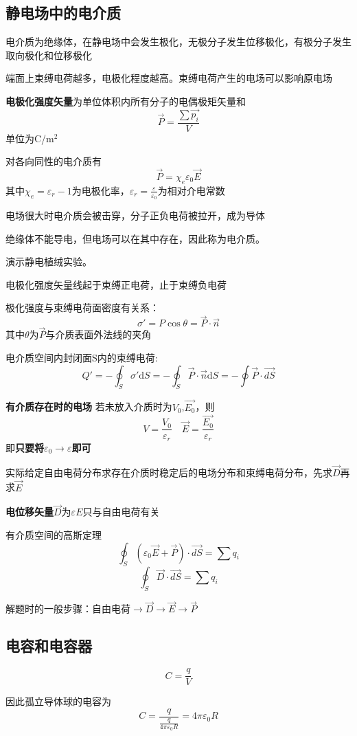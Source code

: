 \documentclass[10pt,a4paper]{article}
\begin{document}
\subsection{静电场中的电介质}
电介质为绝缘体，在静电场中会发生极化，无极分子发生位移极化，有极分子发生取向极化和位移极化

端面上束缚电荷越多，电极化程度越高。束缚电荷产生的电场可以影响原电场

\textbf{电极化强度矢量}为单位体积内所有分子的电偶极矩矢量和
\[\vec{P}=\frac{\sum\vec{p_i}}{V}\]
单位为C/m$^2$

对各向同性的电介质有
\[\boxed{\vec{P}=\chi_e\varepsilon_0\vec{E}}\]
其中$\chi_e=\varepsilon_r-1$为电极化率，$\varepsilon_r=\frac{\varepsilon}{\varepsilon_0}$为相对介电常数

电场很大时电介质会被击穿，分子正负电荷被拉开，成为导体

绝缘体不能导电，但电场可以在其中存在，因此称为电介质。

演示静电植绒实验。

电极化强度矢量线起于束缚正电荷，止于束缚负电荷

极化强度与束缚电荷面密度有关系：
\[\sigma'=P\cos\theta=\vec{P}\cdot\vec{n}\]
其中$\theta$为$\vec{P}$与介质表面外法线的夹角

电介质空间内封闭面S内的束缚电荷:
\[Q'=-\oint_S\sigma'\mathrm{d}S=-\oint_S\vec{P}\cdot\vec{n}\mathrm{d}S=-\oint\vec{P}\cdot\overrightarrow{dS}\]

\textbf{有介质存在时的电场}
若未放入介质时为$V_0$,$\vec{E_0}$，则
\[V=\frac{V_0}{\varepsilon_r}\quad\vec{E}=\frac{\vec{E_0}}{\varepsilon_r}\]
即\textbf{只要将$\varepsilon_0\rightarrow\varepsilon$即可}

实际给定自由电荷分布求存在介质时稳定后的电场分布和束缚电荷分布，先求$\vec{D}$再求$\vec{E}$

\textbf{电位移矢量}$\vec{D}$为$\varepsilon E$只与自由电荷有关

有介质空间的高斯定理
\[\oint_S(\varepsilon_0\vec{E}+\vec{P})\cdot\overrightarrow{dS}=\sum q_i\]
\[\oint_S\vec{D}\cdot\overrightarrow{dS}=\sum q_i\]

解题时的一般步骤：自由电荷$\rightarrow\vec{D}\rightarrow\vec{E}\rightarrow\vec{P}$
\subsection{电容和电容器}
\[C=\frac{q}{V}\]

因此孤立导体球的电容为
\[C=\frac{q}{\frac{q}{4\pi\varepsilon_0R}}=4\pi\varepsilon_0R\]
\end{document}
